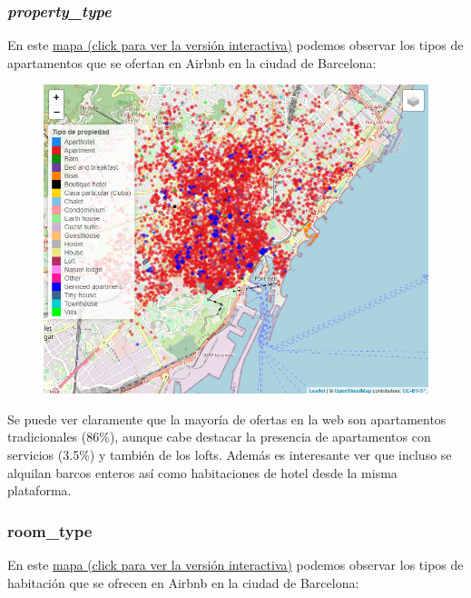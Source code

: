 \documentclass{article}
\begin{document}
\clearpage
\subsubsection{\emph{property\_type}}
En este \href{https://rpubs.com/marctotti5/754319}{mapa (click para ver la versión interactiva)} podemos observar los tipos de apartamentos que se ofertan en Airbnb en la ciudad de Barcelona:

\vspace{0.35cm}
\begin{figure}[h]
\hspace*{-0.15cm}
\centering
\includegraphics[scale = 0.7]{type_of_property}
\end{figure}
\vspace{0.35cm}

Se puede ver claramente que la mayoría de ofertas en la web son apartamentos tradicionales (86\%), aunque cabe destacar la presencia de apartamentos con servicios (3.5\%) y también de los lofts. Además es interesante ver que incluso se alquilan barcos enteros así como habitaciones de hotel desde la misma plataforma.

\clearpage
\subsubsection{room\_type}
En este \href{https://rpubs.com/marctotti5/754608}{mapa (click para ver la versión interactiva)} podemos observar los tipos de habitación que se ofrecen en Airbnb en la ciudad de Barcelona:
\end{document}
